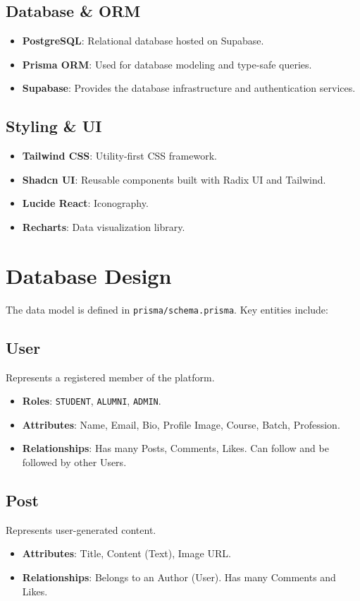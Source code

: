 \documentclass{article}
\begin{document}
\subsection{Database \& ORM}
\begin{itemize}
    \item \textbf{PostgreSQL}: Relational database hosted on Supabase.
    \item \textbf{Prisma ORM}: Used for database modeling and type-safe queries.
    \item \textbf{Supabase}: Provides the database infrastructure and authentication services.
\end{itemize}

\subsection{Styling \& UI}
\begin{itemize}
    \item \textbf{Tailwind CSS}: Utility-first CSS framework.
    \item \textbf{Shadcn UI}: Reusable components built with Radix UI and Tailwind.
    \item \textbf{Lucide React}: Iconography.
    \item \textbf{Recharts}: Data visualization library.
\end{itemize}

\section{Database Design}
The data model is defined in \texttt{prisma/schema.prisma}. Key entities include:

\subsection{User}
Represents a registered member of the platform.
\begin{itemize}
    \item \textbf{Roles}: \texttt{STUDENT}, \texttt{ALUMNI}, \texttt{ADMIN}.
    \item \textbf{Attributes}: Name, Email, Bio, Profile Image, Course, Batch, Profession.
    \item \textbf{Relationships}: Has many Posts, Comments, Likes. Can follow and be followed by other Users.
\end{itemize}

\subsection{Post}
Represents user-generated content.
\begin{itemize}
    \item \textbf{Attributes}: Title, Content (Text), Image URL.
    \item \textbf{Relationships}: Belongs to an Author (User). Has many Comments and Likes.
\end{itemize}
\end{document}
